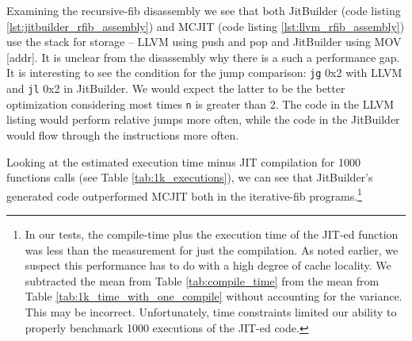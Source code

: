 Examining the recursive-fib disassembly we see that both JitBuilder (code listing \ref{lst:jitbuilder_rfib_assembly}) and MCJIT (code listing \ref{lst:llvm_rfib_assembly}) use the stack for storage -- LLVM using push and pop and JitBuilder using MOV [addr].
It is unclear from the disassembly why there is a such a performance gap.
It is interesting to see the condition for the jump comparison: \texttt{jg} 0x2 with LLVM and \texttt{jl} 0x2 in JitBuilder. 
We would expect the latter to be the better optimization considering most times \texttt{n} is greater than 2.
The code in the LLVM listing would perform relative jumps more often, while the code in the JitBuilder would flow through the instructions more often.

Looking at the estimated execution time minus JIT compilation for 1000 functions calls (see Table \ref{tab:1k_executions}), we can see that JitBuilder's generated code outperformed MCJIT both in the iterative-fib programs.\footnote{In our tests, the compile-time plus the execution time of the JIT-ed function was less than the measurement for just the compilation. As noted earlier, we suspect this performance has to do with a high degree of cache locality. We subtracted the mean from Table \ref{tab:compile_time} from the mean from Table \ref{tab:1k_time_with_one_compile} without accounting for the variance. This may be incorrect. Unfortunately, time constraints limited our ability to properly benchmark 1000 executions of the JIT-ed code.}


